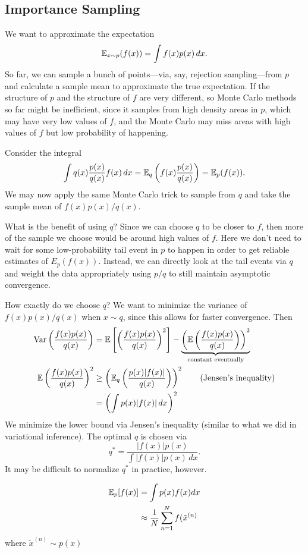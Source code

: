 \documentclass{article}
\begin{document}
\subsection{Importance Sampling}


We want to approximate the expectation \[\mathbb{E}_{x\sim p}(f(x)) = \int f(x) p(x)\,dx.\]
So far, we can sample a bunch of points---via, say, rejection sampling---from $p$ and calculate a sample mean to approximate the true expectation. If the structure of $p$ and the structure of $f$ are very different, so Monte Carlo methods so far might be inefficient, since it samples from high density areas in $p$, which may have very low values of $f$, and the Monte Carlo may miss areas with high values of $f$ but low probability of happening. 

Consider the integral \[
\int q(x) \frac{p(x)}{q(x)}f(x)\,dx = \mathbb{E}_q\left(f(x)\frac{p(x)}{q(x)}\right) = \mathbb{E}_{p}(f(x)).
\]
We may now apply the same Monte Carlo trick to sample from $q$ and take the sample mean of $f(x) p(x)/q(x)$.

What is the benefit of using $q$? Since we can choose $q$ to be closer to $f$, then more of the sample we choose would be around high values of $f$. Here we don't need to wait for some low-probability tail event in $p$ to happen in order to get reliable estimates of $E_p(f(x)).$ Instead, we can directly look at the tail events via $q$ and weight the data appropriately using $p/q$ to still maintain asymptotic convergence.

How exactly do we choose $q$? We want to minimize the variance of $f(x)p(x)/q(x)$ when $x\sim q$, since this allows for faster convergence. Then \begin{align*}
\text{Var}\left(\frac{f(x)p(x)}{q(x)}\right) &= \mathbb{E}\left[\left(\frac{f(x)p(x)}{q(x)}\right)^2\right] - \underbrace{\left(\mathbb{E}\left(\frac{f(x)p(x)}{q(x)}\right)\right)^2}_{\text{constant eventually}} \\
\mathbb{E}\left(\frac{f(x)p(x)}{q(x)}\right)^2 &\ge \left(\mathbb{E}_q\left(\frac{p(x)|f(x)|}{q(x)}\right)\right)^2 \tag{Jensen's inequality}\\
&= \left(\int p(x)|f(x)|\,dx\right)^2
\end{align*}
We minimize the lower bound via Jensen's inequality (similar to what we did in variational inference). The optimal $q$ is chosen via \[
q^* = \frac{|f(x)|p(x)}{
    \int |f(x)|p(x)\,dx
}.
\]
It may be difficult to normalize $q^*$ in practice, however. 


\begin{align*}
    \mathbb{E}_{p}[f(x)] & = \int p(x) f(x) dx \\
    & \approx \frac{1}{N} \sum_{n=1}^{N} f(\tilde{x}^{(n)} 
\end{align*}
where $\tilde{x}^{(n)} \sim p(x)$
\end{document}
